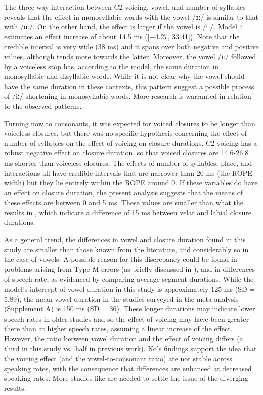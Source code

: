\documentclass[12pt,a4paper,]{article}
\begin{document}
The three-way interaction between C2 voicing, vowel, and number of
syllables reveals that the effect in monosyllabic words with the vowel
/ɜː/ is similar to that with /ɑː/. On the other hand, the effect is
larger if the vowel is /iː/. Model 4 estimates an effect increase of
about 14.5 ms ({[}−4.27, 33.41{]}). Note that the credible interval is
very wide (38 ms) and it spans over both negative and positive values,
although tends more towards the latter. Moreover, the vowel /iː/
followed by a voiceless stop has, according to the model, the same
duration in monosyllabic and disyllabic words. While it is not clear why
the vowel should have the same duration in these contexts, this pattern
suggest a possible process of /iː/ shortening in monosyllabic words.
More research is warranted in relation to the observed patterns.

Turning now to consonants, it was expected for voiced closures to be
longer than voiceless closures, but there was no specific hypothesis
concerning the effect of number of syllables on the effect of voicing on
closure durations. C2 voicing has a robust negative effect on closure
duration, so that voiced closures are 14.6-26.8 ms shorter than
voiceless closures. The effects of number of syllables, place, and
interactions all have credible intervals that are narrower than 20 ms
(the ROPE width) but they lie entirely within the ROPE around 0. If
these variables do have an effect on closure duration, the present
analysis suggests that the means of these effects are between 0 and 5
ms. These values are smaller than what the results in \citet{sharf1962},
which indicate a difference of 15 ms between velar and labial closure
durations.

As a general trend, the differences in vowel and closure duration found
in this study are smaller than those known from the literature, and
considerably so in the case of vowels. A possible reason for this
discrepancy could be found in problems arising from Type M errors (as
briefly discussed in ), and in differences of speech rate,
as evidenced by comparing average segment durations. While the model's
intercept of vowel duration in this study is approximately 125 ms (SD =
5.89), the mean vowel duration in the studies surveyed in the
meta-analysis (Supplement A) is 150 ms (SD = 36). These longer durations
may indicate lower speech rates in older studies and so the effect of
voicing may have been greater there than at higher speech rates,
assuming a linear increase of the effect. However, the ratio between
vowel duration and the effect of voicing differs (a third in this study
vs.~half in previous work). Ko's findings \citeyear{ko2018} support the
idea that the voicing effect (and the vowel-to-consonant ratio) are not
stable across speaking rates, with the consequence that differences are
enhanced at decreased speaking rates. More studies like \citet{ko2018}
are needed to settle the issue of the diverging results.
\end{document}
